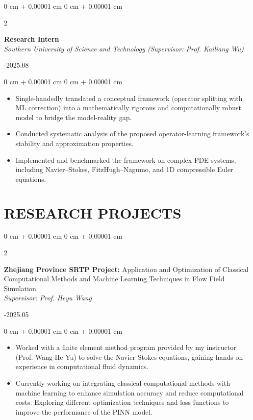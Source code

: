 \documentclass[10pt, letterpaper]{article}
\newenvironment{highlights}{
    \begin{itemize}[
        topsep=0.10 cm,
        parsep=0.10 cm,
        partopsep=0pt,
        itemsep=0pt,
        leftmargin=0 cm + 10pt
    ]
}{
    \end{itemize}
} %
\newenvironment{onecolentry}{
    \begin{adjustwidth}{
        0 cm + 0.00001 cm
    }{
        0 cm + 0.00001 cm
    }
}{
    \end{adjustwidth}
} %
\newenvironment{twocolentry}[2][]{
    \onecolentry
    \def\secondColumn{#2}
    \setcolumnwidth{\fill, 4.5 cm}
    \begin{paracol}{2}
}{
    \switchcolumn \raggedleft \secondColumn
    \end{paracol}
    \endonecolentry
} %
\begin{document}
        \vspace{0.2 cm} %

        \begin{twocolentry}{
            2025.07-2025.08
        }
            \textbf{Research Intern} \\
            \textit{Southern University of Science and Technology (Supervisor: Prof. Kailiang Wu)}
        \end{twocolentry}

        \vspace{0.10 cm}
        \begin{onecolentry}
            \begin{highlights}
                \item Single-handedly translated a conceptual framework (operator splitting with ML correction) into a mathematically rigorous and computationally robust model to bridge the model-reality gap.
                \item Conducted systematic analysis of the proposed operator-learning framework's stability and approximation properties.
                \item Implemented and benchmarked the framework on complex PDE systems, including Navier–Stokes, FitzHugh–Nagumo, and 1D compressible Euler equations.
            \end{highlights}
        \end{onecolentry}


    \section{RESEARCH PROJECTS}
        \begin{twocolentry}{
            2024.03-2025.05
        }
            \textbf{Zhejiang Province SRTP Project:} Application and Optimization of Classical Computational Methods and Machine Learning Techniques in Flow Field Simulation \\ %
            \textit{Supervisor: Prof. Heyu Wang} %
        \end{twocolentry}

        \vspace{0.10 cm}
        \begin{onecolentry}
            \begin{highlights}
                \item Worked with a finite element method program provided by my instructor (Prof. Wang He-Yu) to solve the Navier-Stokes equations, gaining hands-on experience in computational fluid dynamics. %
                \item Currently working on integrating classical computational methods with machine learning to enhance simulation accuracy and reduce computational costs. Exploring different optimization techniques and loss functions to improve the performance of the PINN model. 
            \end{highlights}
        \end{onecolentry}
\end{document}
